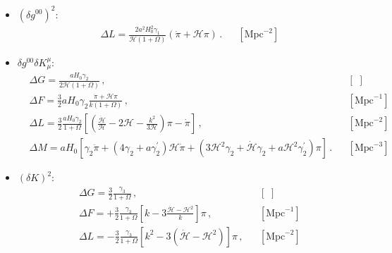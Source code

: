 \documentclass[prd,nofootinbib,showpacs]{revtex4}
\def\l{\left}
\def\r{\right}
\def\f{\frac}
\def\hub{{\mathcal H}}
\begin{document}
{\begin{itemize}
{\begin{align}
%
\Delta X=&1 \,, \hspace{1cm} \Delta \dot{X}=0  \, , & & [\,\, , \,\,] \, \nonumber \\
%
\Delta Y=&  \frac{a\Omega^\prime}{2(1+\Omega)}  \, , & & [\,\, ] \, \nonumber \\
%
\Delta U=&1, \, & & [\,\, ] \, \nonumber \\
%
\Delta V=&\f{1}{2}\f{a\Omega'}{1+\Omega} \,, \hspace{1cm} \Delta \dot{V}=\f{a\hub}{2(1+\Omega)}\l[\Omega' +a\Omega'' -\f{a\Omega'^{\,2}}{1+\Omega} \r] \, , & & [\,\, , \text{Mpc}^{-1}]\nonumber \\ \,
\textcolor{red}{\Delta\mathcal{Q}}=& 1\,, & & [\,\, ]
\end{align}}
%
\item[] \underline{$(\delta g^{00})^2$}:\\
{\small
\begin{align}\label{Eq:ContribGamma1}
& \Delta {{ L}}= \f{2a^2H_0^2\gamma_1}{\hub \l(1 + \Omega \r)}\l(\dot{\pi}+\hub\pi\r)\, .& & [\text{Mpc}^{-2}] \,
\end{align}}
%
\item[] 
\underline{$\delta g^{00}\delta K^\mu_\mu$}:
{\small
\begin{align} \label{Eq:ContribGamma2}
&\Delta{ G}=\f{a H_0 \gamma_2}{2\hub(1+\Omega)} \, , & & [\,\,] \,\nonumber \\
%
&\Delta{ F}=\f{3}{2}aH_0\gamma_2\f{\dot{\pi}+\hub\pi}{k(1+\Omega)}\, , & &  [\text{Mpc}^{-1}] \,\nonumber\\
%
&\Delta{ L}=\f{3}{2} \f{a H_0\gamma_2}{1+\Omega}\left[\l(\f{\dot{\hub}}{\hub}-2\hub-\f{k^2}{3\hub}\r)\pi-\dot{\pi}\r] \, ,& &  [\text{Mpc}^{-2}] \,\nonumber\\
%
&\Delta{ M}= aH_0\l[\gamma_2\ddot{\pi}+\l(4\gamma_2+a\gamma_2^\prime\r)\hub\dot{\pi}+\l(3\hub^2\gamma_2+\dot{\hub}\gamma_2+a\hub^2\gamma_2^\prime\r)\pi\r]\, . & &  [\text{Mpc}^{-3}] \,
\end{align}}
%
\item[] \underline{$(\delta K)^2$}:\\
{\small
\begin{align} \label{Eq:ContribGamma3}
%
&\Delta{ G}=\f{3}{2}\f{\gamma_3}{1+\Omega}\, , & &  [\,\,]  \,\nonumber \\
%
&\Delta{ F}=+\f{3}{2}\f{\gamma_3}{1+\Omega}\l[k-3\f{\dot{\hub}-\hub^2}{k}\r]\pi \, , & &  [\text{Mpc}^{-1}] \,\nonumber\\
%
&\Delta{ L}= -\f{3}{2}\f{\gamma_3}{1+\Omega}\l[k^2-3\l(\dot{\hub}-\hub^2\r)\r]\pi \, ,& &  [\text{Mpc}^{-2}] \,\nonumber\\

\end{align}}
\end{itemize}}
\end{document}
